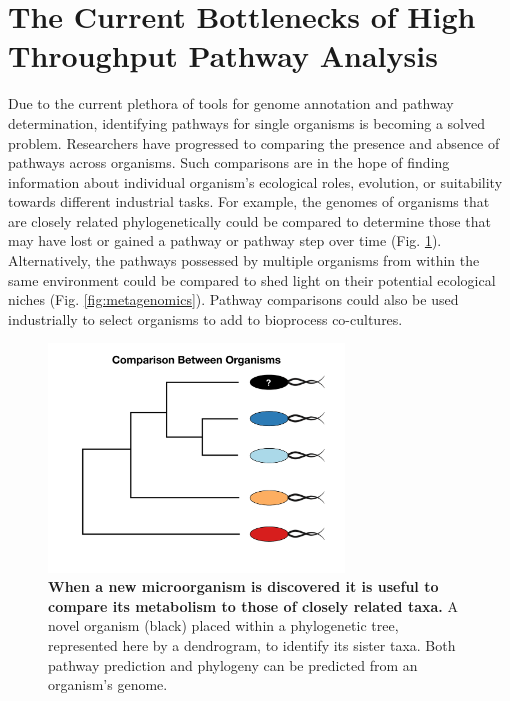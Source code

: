 \section{The Current Bottlenecks of High Throughput Pathway Analysis}

Due to the current plethora of tools for genome annotation and pathway 
determination, identifying pathways for single organisms is becoming a solved 
problem. Researchers have progressed to comparing the presence and absence of 
pathways across organisms. Such comparisons are in the hope of finding 
information about individual organism's ecological roles, evolution, or 
suitability towards different industrial tasks. For example, the genomes of 
organisms that are closely related phylogenetically could be compared to 
determine those that may have lost or gained a pathway or pathway step over time 
(Fig. \ref{fig:phylogenetic-comparison}). Alternatively, the pathways possessed 
by multiple organisms from within the same environment could be compared to shed 
light on their potential ecological niches (Fig. \ref{fig:metagenomics}). 
Pathway comparisons could also be used industrially to select organisms to add 
to bioprocess co-cultures.

\begin{figure}[!ht]
  \centering
	\includegraphics[width=0.7\textwidth]{media/compare-phylogenetically.pdf}
	 \caption[When a new microorganism is discovered it is useful to compare its 
metabolism to those of closely related taxa.]{\textbf{When a new microorganism 
is discovered it is useful to compare its metabolism to those of closely related 
taxa.} A novel organism (black) placed within a phylogenetic tree, represented 
here by a dendrogram, to identify its sister taxa. Both pathway prediction and 
phylogeny can be predicted from an organism's genome.}
	 \label{fig:phylogenetic-comparison}
\end{figure}

